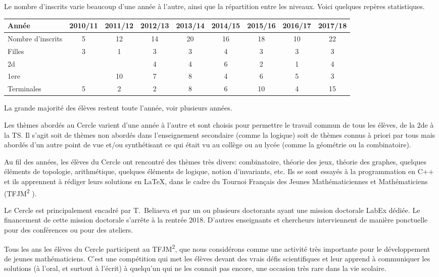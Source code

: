 \documentclass[11pt,notitlepage]{article}
\begin{document}
Le nombre d'inscrits varie beaucoup d'une ann\'ee \`a l'autre, ainsi que la r\'epartition entre les niveaux. Voici quelques rep\`eres statistiques.

\medskip

\begin{tabular}{|l|c|c|c|c|c|c|c|c|}
	\hline
	Ann\'ee & 2010/11&2011/12&2012/13&2013/14&2014/15&2015/16& 2016/17&2017/18\\
	\hline
	Nombre d'inscrits&5 &12 &14 & 20&16 & 18&10 &22 \\
	\hline
	Filles& 3&1 &3 &3&4 &3 & 3&3 \\
	\hline
	2d& & &4 &4 &6 &2 &1 & 4\\
	\hline
	1ere& & 10&7 & 8&4 &6 &5 &3 \\
	\hline
	Terminales&5 &2 &2 &8 &6 &10 &4 &15 \\
	\hline
\end{tabular}

\medskip

La grande majorit\'e des \'el\`eves restent toute l'ann\'ee, voir plusieurs ann\'ees.

 Les th\`emes abord\'es au Cercle varient d'une ann\'ee \`a l'autre et
sont choisis pour permettre
le travail commun de tous les \'el\`eves, de la 2de \`a la TS. Il s'agit soit de th\`emes non abord\'es dans l'enseignement secondaire (comme la logique) soit de th\`emes 
connus \`a priori par tous mais abord\'es d'un autre point de vue et/ou synth\'etisant ce qui \'etait vu au coll\`ege ou au lyc\'ee (comme la g\'eom\'etrie ou la combinatoire).

Au fil des ann\'ees, les \'el\`eves du Cercle ont rencontr\'e  des th\`emes tr\`es divers: combinatoire, th\'eorie des jeux, th\'eorie des graphes, quelques \'el\'ements de topologie, 
arithm\'etique, quelques \'el\'ements de logique, notion d'invariants, etc. Ils se sont essay\'es \`a la programmation en C++ et ils apprennent \`a r\'ediger  leurs solutions en \LaTeX, 
dans le cadre du Tournoi Fran\c cais des Jeunes Math\'ematiciennes et Math\'ematiciens (TFJM\textsuperscript{2} ).

Le Cercle est principalement encadr\'e par T.~Beliaeva et par un ou plusieurs doctorants ayant une mission doctorale LabEx d\'edi\'ee. 
Le financement de cette mission doctorale s'arr\^ete \`a la rentr\'ee 2018. D'autres enseignants et chercheurs interviennent de mani\`ere ponctuelle pour des conf\'erences ou pour des ateliers.

Tous les ans les \'el\`eves du Cercle  participent au TFJM\textsuperscript{2}, que nous consid\'erons comme une activit\'e tr\`es importante pour le d\'eveloppement de jeunes math\'ematiciens. 
C'est une comp\'etition qui met les \'el\`eves devant des vrais d\'efis scientifiques et leur  apprend \`a communiquer les solutions (\`a l'oral, et surtout \`a l'\'ecrit)
 \`a quelqu'un qui ne les connait pas encore, une occasion tr\`es rare dans la vie scolaire.
 
\end{document}
